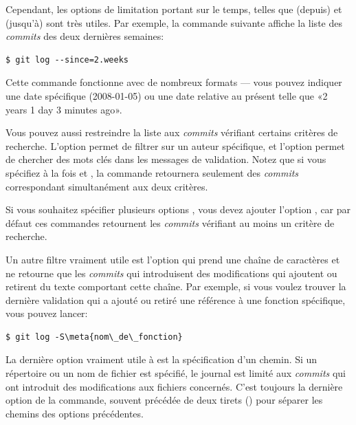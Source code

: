 Cependant, les options de limitation portant sur le temps, telles que  (depuis) et  (jusqu'à) sont très utiles.
Par exemple, la commande suivante affiche la liste des \emph{commits} des deux dernières semaines:
\begin{Schunk}
\begin{Verbatim}
$ git log --since=2.weeks
\end{Verbatim}
\end{Schunk}

Cette commande fonctionne avec de nombreux formats --- vous pouvez indiquer une date spécifique (2008-01-05) ou une date relative au présent telle que «2 years 1 day 3 minutes ago».

Vous pouvez aussi restreindre la liste aux \emph{commits} vérifiant certains critères de recherche.
L'option  permet de filtrer sur un auteur spécifique, et l'option  permet de chercher des mots clés dans les messages de validation.
Notez que si vous spécifiez à la fois  et , la commande retournera seulement des \emph{commits} correspondant simultanément aux deux critères.

Si vous souhaitez spécifier plusieurs options ,  vous devez ajouter l'option , car par défaut ces commandes retournent les \emph{commits} vérifiant au moins un critère de recherche.

Un autre filtre vraiment utile est l'option  qui prend une chaîne de caractères et ne retourne que les \emph{commits} qui introduisent des modifications qui ajoutent ou retirent du texte comportant cette chaîne.
Par exemple, si vous voulez trouver la dernière validation qui a ajouté ou retiré une référence à une fonction spécifique, vous pouvez lancer:
\begin{Schunk}
\begin{Verbatim}[commandchars=\\\{\}]
$ git log -S\meta{nom\_de\_fonction}
\end{Verbatim}
\end{Schunk}

La dernière option vraiment utile à  est la spécification d'un chemin.
Si un répertoire ou un nom de fichier est spécifié, le journal est limité aux \emph{commits} qui ont introduit des modifications aux fichiers concernés.
C'est toujours la dernière option de la commande, souvent précédée de deux tirets (\code{--}) pour séparer les chemins des options précédentes.

